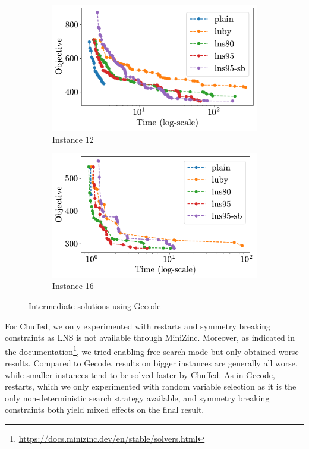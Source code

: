 \begin{figure}[H]
    \centering
    \begin{subfigure}{0.49\linewidth}
        \centering
        \includegraphics[width=\linewidth]{img/cp/obj-plot_inst12.pdf}
        \caption{Instance 12}
    \end{subfigure}
    \hfill
    \begin{subfigure}{0.49\linewidth}
        \centering
        \includegraphics[width=\linewidth]{img/cp/obj-plot_inst16.pdf}
        \caption{Instance 16}
    \end{subfigure}
    \caption{Intermediate solutions using Gecode}
    \label{fig:cp_obj_plots}
\end{figure}

For Chuffed, we only experimented with restarts and symmetry breaking constraints as LNS is not available through MiniZinc. Moreover, as indicated in the documentation\footnote{\url{https://docs.minizinc.dev/en/stable/solvers.html}}, we tried enabling free search mode but only obtained worse results. Compared to Gecode, results on bigger instances are generally all worse, while smaller instances tend to be solved faster by Chuffed. As in Gecode, restarts, which we only experimented with random variable selection as it is the only non-deterministic search strategy available, and symmetry breaking constraints both yield mixed effects on the final result.

